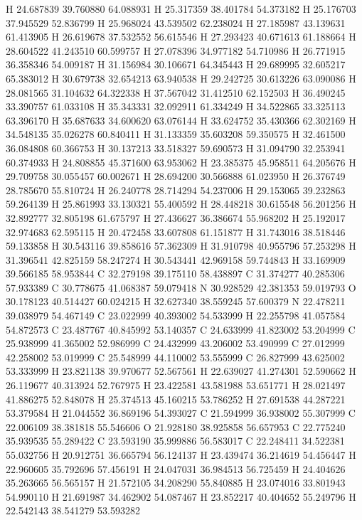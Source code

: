 \documentclass{article}
\begin{document}
H 24.687839 39.760880 64.088931
H 25.317359 38.401784 54.373182
H 25.176703 37.945529 52.836799
H 25.968024 43.539502 62.238024
H 27.185987 43.139631 61.413905
H 26.619678 37.532552 56.615546
H 27.293423 40.671613 61.188664
H 28.604522 41.243510 60.599757
H 27.078396 34.977182 54.710986
H 26.771915 36.358346 54.009187
H 31.156984 30.106671 64.345443
H 29.689995 32.605217 65.383012
H 30.679738 32.654213 63.940538
H 29.242725 30.613226 63.090086
H 28.081565 31.104632 64.322338
H 37.567042 31.412510 62.152503
H 36.490245 33.390757 61.033108
H 35.343331 32.092911 61.334249
H 34.522865 33.325113 63.396170
H 35.687633 34.600620 63.076144
H 33.624752 35.430366 62.302169
H 34.548135 35.026278 60.840411
H 31.133359 35.603208 59.350575
H 32.461500 36.084808 60.366753
H 30.137213 33.518327 59.690573
H 31.094790 32.253941 60.374933
H 24.808855 45.371600 63.953062
H 23.385375 45.958511 64.205676
H 29.709758 30.055457 60.002671
H 28.694200 30.566888 61.023950
H 26.376749 28.785670 55.810724
H 26.240778 28.714294 54.237006
H 29.153065 39.232863 59.264139
H 25.861993 33.130321 55.400592
H 28.448218 30.615548 56.201256
H 32.892777 32.805198 61.675797
H 27.436627 36.386674 55.968202
H 25.192017 32.974683 62.595115
H 20.472458 33.607808 61.151877
H 31.743016 38.518446 59.133858
H 30.543116 39.858616 57.362309
H 31.910798 40.955796 57.253298
H 31.396541 42.825159 58.247274
H 30.543441 42.969158 59.744843
H 33.169909 39.566185 58.953844
C 32.279198 39.175110 58.438897
C 31.374277 40.285306 57.933389
C 30.778675 41.068387 59.079418
N 30.928529 42.381353 59.019793
O 30.178123 40.514427 60.024215
H 32.627340 38.559245 57.600379
N 22.478211 39.038979 54.467149
C 23.022999 40.393002 54.533999
H 22.255798 41.057584 54.872573
C 23.487767 40.845992 53.140357
C 24.633999 41.823002 53.204999
C 25.938999 41.365002 52.986999
C 24.432999 43.206002 53.490999
C 27.012999 42.258002 53.019999
C 25.548999 44.110002 53.555999
C 26.827999 43.625002 53.333999
H 23.821138 39.970677 52.567561
H 22.639027 41.274301 52.590662
H 26.119677 40.313924 52.767975
H 23.422581 43.581988 53.651771
H 28.021497 41.886275 52.848078
H 25.374513 45.160215 53.786252
H 27.691538 44.287221 53.379584
H 21.044552 36.869196 54.393027
C 21.594999 36.938002 55.307999
C 22.006109 38.381818 55.546606
O 21.928180 38.925858 56.657953
C 22.775240 35.939535 55.289422
C 23.593190 35.999886 56.583017
C 22.248411 34.522381 55.032756
H 20.912751 36.665794 56.124137
H 23.439474 36.214619 54.456447
H 22.960605 35.792696 57.456191
H 24.047031 36.984513 56.725459
H 24.404626 35.263665 56.565157
H 21.572105 34.208290 55.840885
H 23.074016 33.801943 54.990110
H 21.691987 34.462902 54.087467
H 23.852217 40.404652 55.249796
H 22.542143 38.541279 53.593282
~    
   
\end{document}
